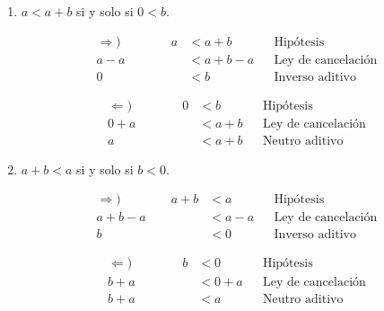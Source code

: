 \documentclass[11pt]{article}
\begin{document}
\begin{enumerate}[label=\alph*)]
\begin{enumerate}[label=\roman*)]
        \item $a<a+b$ si y solo si $0<b$.
        \begin{center}\vspace{-1em}
        \begin{minipage}[l]{.5\linewidth}
            \begin{align*}
                \Rightarrow) \qquad \qquad
                a &< a + b && \text{Hipótesis}\\
                a -a &< a + b - a && \text{Ley de cancelación}\\
                0 &< b && \text{Inverso aditivo}
            \end{align*}
        \end{minipage}%
        \begin{minipage}[r]{.5\linewidth}
            \begin{align*}
                \Leftarrow) \qquad \qquad
                0 &< b && \text{Hipótesis}\\
                0 + a &< a + b && \text{Ley de cancelación}\\
                a &< a + b && \text{Neutro aditivo}
            \end{align*}
        \end{minipage}
        \end{center}
        \item $a+b<a$ si y solo si $b<0$.
        \begin{center}\vspace{-1em}
        \begin{minipage}[l]{.5\linewidth}
            \begin{align*} \Rightarrow) \qquad \qquad
                a+b &< a && \text{Hipótesis}\\
                a+b-a &< a-a && \text{Ley de cancelación}\\
                b &< 0 && \text{Inverso aditivo}
            \end{align*}
        \end{minipage}%
        \begin{minipage}[r]{.5\linewidth}
            \begin{align*} \Leftarrow) \qquad \qquad
                b &< 0 && \text{Hipótesis}\\
                b + a &< 0 + a && \text{Ley de cancelación}\\
                b+ a &< a && \text{Neutro aditivo}
            \end{align*}
        \end{minipage}

\end{center}
\end{enumerate}
\end{enumerate}
\end{document}
